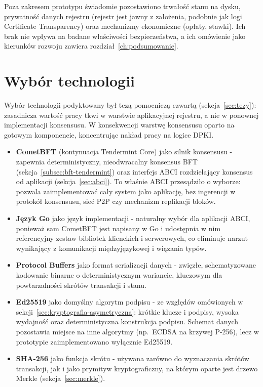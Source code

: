 Poza zakresem prototypu świadomie pozostawiono trwałość stanu na dysku, prywatność danych rejestru (rejestr jest jawny z założenia, podobnie jak logi Certificate Transparency) oraz mechanizmy ekonomiczne (opłaty, stawki). Ich brak nie wpływa na badane właściwości bezpieczeństwa, a ich omówienie jako kierunków rozwoju zawiera rozdział~\ref{ch:podsumowanie}.

\section{Wybór technologii}
\label{sec:wybor-technologii}

Wybór technologii podyktowany był tezą pomocniczą czwartą (sekcja~\ref{sec:tezy}): zasadnicza wartość pracy tkwi w warstwie aplikacyjnej rejestru, a nie w ponownej implementacji konsensusu. W konsekwencji warstwę konsensusu oparto na gotowym komponencie, koncentrując nakład pracy na logice DPKI.

\begin{itemize}
    \item \textbf{CometBFT} (kontynuacja Tendermint Core) jako silnik konsensusu - zapewnia deterministyczny, nieodwracalny konsensus BFT (sekcja~\ref{subsec:bft-tendermint}) oraz interfejs ABCI rozdzielający konsensus od aplikacji (sekcja~\ref{sec:abci}). To właśnie ABCI przesądziło o wyborze: pozwala zaimplementować cały system jako aplikację, bez ingerencji w protokół konsensusu, sieć P2P czy mechanizm replikacji bloków.
    \item \textbf{Język Go} jako język implementacji - naturalny wybór dla aplikacji ABCI, ponieważ sam CometBFT jest napisany w Go i udostępnia w nim referencyjny zestaw bibliotek klienckich i serwerowych, co eliminuje narzut wynikający z komunikacji międzyjęzykowej i wiązania typów.
    \item \textbf{Protocol Buffers} jako format serializacji danych - zwięzłe, schematyzowane kodowanie binarne o deterministycznym wariancie, kluczowym dla powtarzalności skrótów transakcji i stanu.
    \item \textbf{Ed25519} jako domyślny algorytm podpisu - ze względów omówionych w sekcji~\ref{sec:kryptografia-asymetryczna}: krótkie klucze i podpisy, wysoka wydajność oraz deterministyczna konstrukcja podpisu. Schemat danych pozostawia miejsce na inne algorytmy (np.\ ECDSA na krzywej P-256), lecz w prototypie zaimplementowano wyłącznie Ed25519.
    \item \textbf{SHA-256} jako funkcja skrótu - używana zarówno do wyznaczania skrótów transakcji, jak i jako prymityw kryptograficzny, na którym oparte jest drzewo Merkle (sekcja~\ref{sec:merkle}).
\end{itemize}

